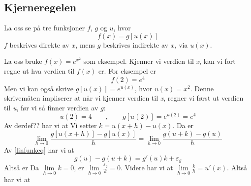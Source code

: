 \subsection{Kjerneregelen}
La oss se på tre funksjoner $ f $, $ g $ og $ u $, hvor
\[ f(x)= g\left[u(x)\right] \]
$ f $ beskrives direkte av $ x $, mens $ g $ beskrives indirekte av $ x $, via $ u(x) $. \vsk

La oss bruke $f(x) =e^{x^2} $ som eksempel. Kjenner vi verdien til \textit{x}, kan vi fort regne ut hva verdien til $ f(x) $ er. For eksempel er
\[ f(2)=e^4 \]
Men vi kan også skrive $ {g\left[u(x)\right]=e^{u(x)}} $, hvor $ u(x)=x^2 $. Denne skrivemåten impliserer at når vi kjenner verdien til \textit{x}, regner vi først ut verdien til \textit{u}, før vi så finner verdien av $g$: 
\[ u(2) =4\qquad,\qquad 
g\left[u(2)\right]=e^{u(2)}=e^4 \]
Av derdef?? har vi at
Vi setter $ k = u(x+h)-u(x) $. Da er
\[ \lim\limits_{h \to 0}\frac{g\left[u(x+h)\right]-g\left[u(x)\right]}{h}= \lim\limits_{h \to 0}\frac{g(u+k)-g(u)}{h} \]
Av \eqref{linfunkeq} har vi at
\[ g(u)-g(u+k)= g'(u)k+\varepsilon_g  \]
Altså er
Da $ \lim\limits_{h\to0}k=0 $, er $ \lim\limits_{h\to0}\frac{\varepsilon_g}{k}=0 $. Videre har vi at $ \lim\limits_{h\to0}\frac{k}{h}=u'(x) $. Altså har vi at
\regv
{}
